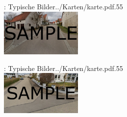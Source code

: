 \documentclass[11pt, dvipsnames,aspectratio=169]{beamer}
\begin{document}
\begin{mapframe}{\Ort: Typische Bilder}{../Karten/karte.pdf}{.55\textwidth}
	\centering
	 \\[.3cm]
	\includegraphics[width=4cm]{../Bilder/innenstadt.png} \\
	\scriptsize \bildeins
\end{mapframe}

\begin{mapframe}{\Ort: Typische Bilder}{../Karten/karte.pdf}{.55\textwidth}
	\centering
	 \\[.3cm]
	\includegraphics[width=4cm]{../Bilder/wohnsiedlung.png} \\
	\scriptsize \bildzwei
\end{mapframe}
\end{document}
